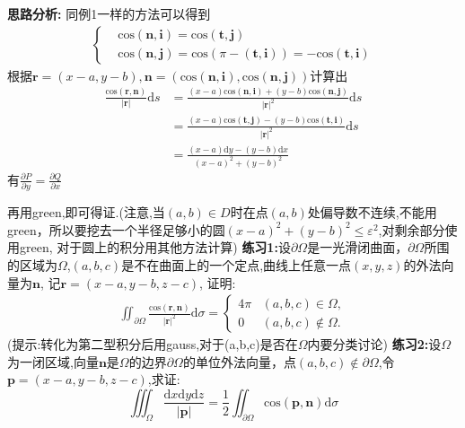 \documentclass{ctexart}
\begin{document}
\textbf{思路分析:}
同例1一样的方法可以得到
\begin{eqnarray}\nonumber
\begin{cases}
&\mathrm{cos}(\bm{n,i})=\mathrm{cos}(\bm{t,j})\\
&\mathrm{cos}(\bm{n,j})=\mathrm{cos}(\pi-(\bm{t,i}))=-\mathrm{cos}(\bm{t,i})
\end{cases}
\end{eqnarray}根据$\bm{r}=(x-a,y-b),\bm{n}=(\mathrm{cos}(\bm{n,i}),\mathrm{cos}(\bm{n,j}))$计算出
\begin{align}
\frac{\mathrm{cos}(\bm{r,n})}{|\bm{r}|}\mathrm{d}s&=\frac{(x-a)\mathrm{cos}(\bm{n,i})+(y-b)\mathrm{cos}(\bm{n,j})}{|\bm{r}|^{2}}\mathrm{d}s\nonumber\\
&=\frac{(x-a)\mathrm{cos}(\bm{t,j})-(y-b)\mathrm{cos}(\bm{t,i})}{|\bm{r}|^{2}}\mathrm{d}s\nonumber\\
&=\frac{(x-a)\mathrm{d}y-(y-b)\mathrm{d}x}{(x-a)^{2}+(y-b)^{2}}\nonumber
\end{align}
有$\frac{\partial P}{\partial y}=\frac{\partial Q}{\partial x}$

再用green,即可得证.(注意,当$(a,b)\in D$时在点$(a,b)$处偏导数不连续,不能用green，所以要挖去一个半径足够小的圆$(x-a)^{2}+(y-b)^{2}\leq \varepsilon^{2}$,对剩余部分使用green, 对于圆上的积分用其他方法计算)
\newline
\newline
\indent\textbf{练习1:}设$\partial \Omega$是一光滑闭曲面，$\partial\Omega$所围的区域为$\Omega$,$(a,b,c)$是不在曲面上的一个定点,曲线上任意一点$(x,y,z)$的外法向量为$\bm{n}$, 记$\bm{r}=(x-a,y-b,z-c)$, 证明:
\begin{eqnarray}
\iint_{\partial\Omega} \frac{\mathrm{cos}(\bm{r,n})}{|\bm{r}|^{2}}\mathrm{d}\sigma=
\begin{cases}
4\pi&(a,b,c)\in \Omega,\\
0&(a,b,c)\notin \Omega.
\end{cases}
\end{eqnarray}
(提示:转化为第二型积分后用gauss,对于(a,b,c)是否在$\Omega$内要分类讨论)
\newline
\newline
\indent\textbf{练习2:}设$\Omega$为一闭区域,向量$\bm{n}$是$\Omega$的边界$\partial \Omega$的单位外法向量，点$(a,b,c)\notin\partial\Omega$,令$\bm{p}=(x-a,y-b,z-c)$,求证:
$$\iiint_{\Omega}\frac{\mathrm{d}x\mathrm{d}y\mathrm{d}z}{|\bm{p}|}=\frac{1}{2}\iint_{\partial \Omega}\mathrm{cos}(\bm{p,n})\mathrm{d}\sigma$$
\end{document}
